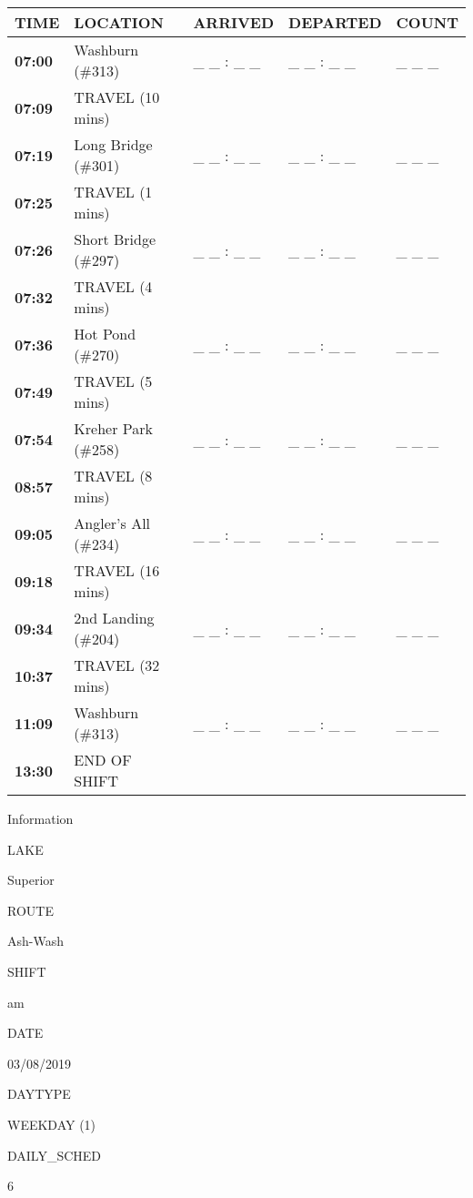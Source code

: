 \documentclass[]{article}
\begin{document}
\begin{tabular}{>{\bfseries}lllll}
\toprule
\textbf{TIME} & \textbf{LOCATION} & \textbf{ARRIVED} & \textbf{DEPARTED} & \textbf{COUNT}\\
\midrule
07:00 & Washburn (\#313) & \_ \_ : \_ \_ & \_ \_ : \_ \_ & \_ \_ \_\\
07:09 & TRAVEL (10 mins) &  &  & \\
07:19 & Long Bridge (\#301) & \_ \_ : \_ \_ & \_ \_ : \_ \_ & \_ \_ \_\\
07:25 & TRAVEL (1 mins) &  &  & \\
07:26 & Short Bridge (\#297) & \_ \_ : \_ \_ & \_ \_ : \_ \_ & \_ \_ \_\\
07:32 & TRAVEL (4 mins) &  &  & \\
07:36 & Hot Pond (\#270) & \_ \_ : \_ \_ & \_ \_ : \_ \_ & \_ \_ \_\\
07:49 & TRAVEL (5 mins) &  &  & \\
07:54 & Kreher Park (\#258) & \_ \_ : \_ \_ & \_ \_ : \_ \_ & \_ \_ \_\\
08:57 & TRAVEL (8 mins) &  &  & \\
09:05 & Angler's All (\#234) & \_ \_ : \_ \_ & \_ \_ : \_ \_ & \_ \_ \_\\
09:18 & TRAVEL (16 mins) &  &  & \\
09:34 & 2nd Landing (\#204) & \_ \_ : \_ \_ & \_ \_ : \_ \_ & \_ \_ \_\\
10:37 & TRAVEL (32 mins) &  &  & \\
11:09 & Washburn (\#313) & \_ \_ : \_ \_ & \_ \_ : \_ \_ & \_ \_ \_\\
13:30 & END OF SHIFT &  &  & \\
\bottomrule
\end{tabular}\newpage

Information

LAKE

Superior

ROUTE

Ash-Wash

SHIFT

am

DATE

03/08/2019

DAYTYPE

WEEKDAY (1)

DAILY\_SCHED

6

\vspace{24pt}
\end{document}
